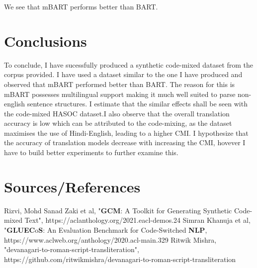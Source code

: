 \documentclass{article}
\begin{document}
We see that mBART performs better than BART.
\newpage
\section{Conclusions}
To conclude, I have sucessfully produced a synthetic code-mixed dataset from the corpus provided. I have used a dataset similar to the one I have produced  and observed that mBART performed better than BART. The reason for this is mBART possesses multilingual support making it much well suited to parse non-english sentence structures.
\newline\newline
I estimate that the similar effects shall be seen with the code-mixed HASOC dataset.I also observe that the overall translation accuracy is low which can be attributed to the code-mixing, as the dataset maximises the use of Hindi-English, leading to a higher CMI. I hypothesize that the accuracy of translation models decrease with increasing the CMI, hovever I have to build better experiments to further examine this.


\section{Sources/References}
Rizvi, Mohd Sanad Zaki et al, "\textbf{GCM}: A Toolkit for Generating Synthetic Code-mixed Text", https://aclanthology.org/2021.eacl-demos.24
\newline\newline
Simran Khanuja et al, "\textbf{GLUEC}o\textbf{S}: An Evaluation Benchmark for Code-Switched \textbf{NLP}, \newline https://www.aclweb.org/anthology/2020.acl-main.329
\newline\newline
Ritwik Mishra, "devanagari-to-roman-script-transliteration", https://github.com/ritwikmishra/devanagari-to-roman-script-transliteration
\newline\newline
\end{document}
